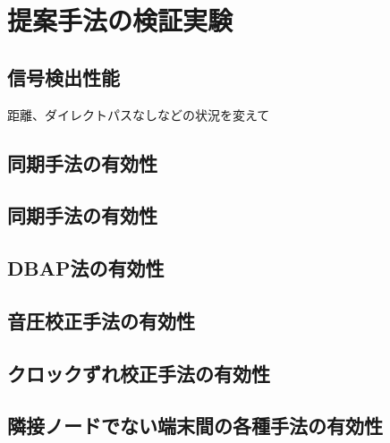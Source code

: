 \chapter{提案手法の検証実験}
\section{信号検出性能}
距離、ダイレクトパスなしなどの状況を変えて

\section{同期手法の有効性}

\section{同期手法の有効性}
\section{DBAP法の有効性}
\section{音圧校正手法の有効性}
\section{クロックずれ校正手法の有効性}
\section{隣接ノードでない端末間の各種手法の有効性}
